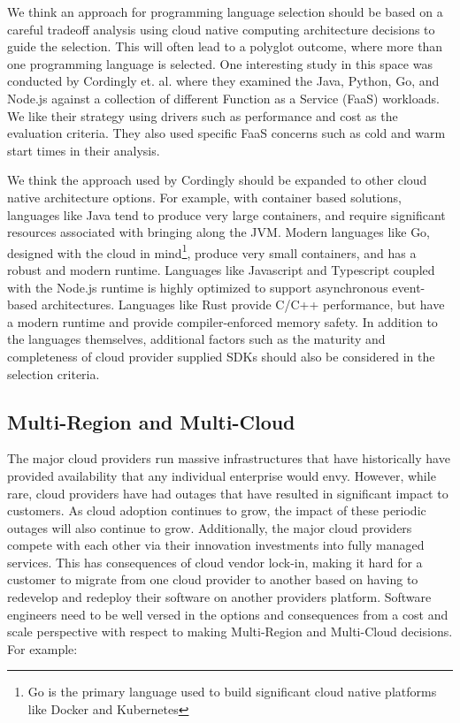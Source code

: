 \documentclass[conference]{IEEEconf}
\begin{document}
We think an approach for programming language selection should be based on a careful tradeoff analysis using cloud native computing architecture decisions to guide the selection.  This will often lead to a polyglot outcome, where more than one programming language is selected.  One interesting study in this space was conducted by Cordingly et. al.\cite{Serverless} where they examined the Java, Python, Go, and Node.js against a collection of different Function as a Service (FaaS) workloads.  We like their strategy using drivers such as performance and cost as the evaluation criteria.  They also used specific FaaS concerns such as cold and warm start times in their analysis. 

We think the approach used by Cordingly should be expanded to other cloud native architecture options.  For example, with container based solutions, languages like Java tend to produce very large containers, and require significant resources associated with bringing along the JVM.  Modern languages like Go, designed with the cloud in mind\footnote{Go is the primary language used to build significant cloud native platforms like Docker and Kubernetes}, produce very small containers, and has a robust and modern runtime.  Languages like Javascript and Typescript coupled with the Node.js runtime is highly optimized to support asynchronous event-based architectures. Languages like Rust provide C/C++ performance, but have a modern runtime and provide compiler-enforced memory safety. In addition to the languages themselves, additional factors such as the maturity and completeness of cloud provider supplied SDKs should also be considered in the selection criteria. 

\subsection{Multi-Region and Multi-Cloud}
The major cloud providers run massive infrastructures that have historically have provided availability that any individual enterprise would envy. However, while rare, cloud providers have had outages that have resulted in significant impact to customers. As cloud adoption continues to grow, the impact of these periodic outages will also continue to grow.  Additionally, the major cloud providers compete with each other via their innovation investments into fully managed services.  This has consequences of cloud vendor lock-in, making it hard for a customer to migrate from one cloud provider to another based on having to redevelop and redeploy their software on another providers platform.  Software engineers need to be well versed in the options and consequences from a cost and scale perspective with respect to making Multi-Region and Multi-Cloud decisions. For example: 
\end{document}

